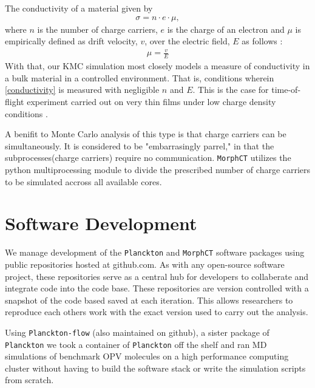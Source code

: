 The conductivity of a material given by 
\begin{align}
    \label{conductivity}
    \sigma = n \cdot e \cdot \mu,
\end{align}
where $n$ is the number of charge carriers, $e$ is the charge of an electron and $\mu$ is empirically
defined as drift velocity, $v$, over the electric field, $E$ as follows \cite{Kokil2012}:
\begin{align}
    \label{m}
    \mu = \frac{v}{E}
\end{align}
With that, our KMC simulation most closely models a measure of conductivity in a bulk material in a controlled
environment. That is, conditions wherein \autoref{conductivity} is measured with negligible $n$ and $E$.
This is the case for time-of-flight experiment carried out on very thin films under low charge density
conditions \cite{Chen2000a}.

A benifit to Monte Carlo analysis of this type is that charge carriers can be simultaneously. It is considered
to be "embarrasingly parrel," in that the subprocesses(charge carriers) require no communication.
\texttt{MorphCT} utilizes the python multiprocessing module to divide the prescribed number of charge carriers to be
simulated accross all available cores.

\section{Software Development}
\label{software-methods}

We manage development of the \texttt{Planckton} and \texttt{MorphCT} software packages using public repositories hosted at
github.com\cite{cmelab}.
As with any open-source software project, these repositories serve as a
central hub for developers to collaberate and integrate code into the code base. These repositories are
version controlled with a snapshot of the code based saved at each iteration. This allows researchers to 
reproduce each others work with the exact version used to carry out the analysis. 

Using \texttt{Planckton-flow} (also maintained on github), a sister package
of \texttt{Planckton} we took a container of \texttt{Planckton} off the shelf and ran MD simulations of benchmark OPV
molecules on a high performance computing cluster without having to build the software stack or write the
simulation scripts from scratch. 

